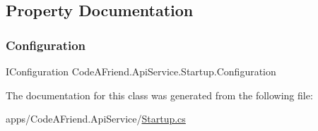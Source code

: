 \subsection{Property Documentation}
\mbox{\label{class_code_a_friend_1_1_api_service_1_1_startup_a53ca4b71e663aaae2bd2dc2e2b8395fb}} 
\subsubsection{\texorpdfstring{Configuration}{Configuration}}
{\footnotesize\ttfamily I\+Configuration Code\+A\+Friend.\+Api\+Service.\+Startup.\+Configuration\hspace{0.3cm}{\ttfamily [get]}}



The documentation for this class was generated from the following file\+:\begin{DoxyCompactItemize}
\item 
apps/\+Code\+A\+Friend.\+Api\+Service/\mbox{\hyperlink{_startup_8cs}{Startup.\+cs}}\end{DoxyCompactItemize}
